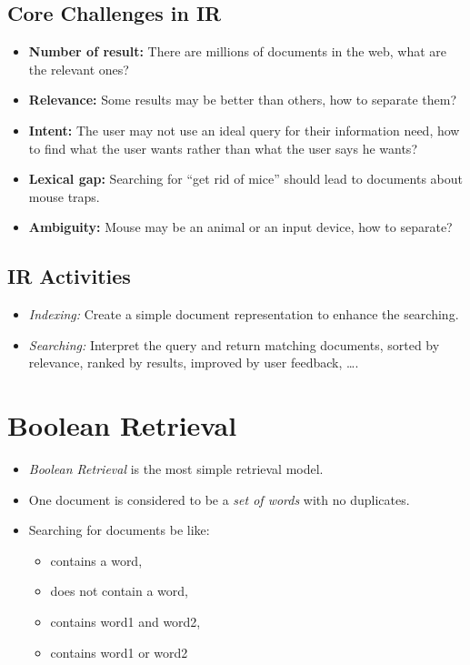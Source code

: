         \subsection{Core Challenges in IR} %
            \begin{itemize}
            	\item \textbf{Number of result:} There are millions of documents in the web, what are the relevant ones?
            	\item \textbf{Relevance:} Some results may be better than others, how to separate them?
            	\item \textbf{Intent:} The user may not use an ideal query for their information need, how to find what the user wants rather than what the user says he wants?
            	\item \textbf{Lexical gap:} Searching for \enquote{get rid of mice} should lead to documents about mouse traps.
            	\item \textbf{Ambiguity:} Mouse may be an animal or an input device, how to separate?
            \end{itemize}

        \subsection{IR Activities} %
            \begin{itemize}
            	\item \textit{Indexing:} Create a simple document representation to enhance the searching.
            	\item \textit{Searching:} Interpret the query and return matching documents, sorted by relevance, ranked by results, improved by user feedback, \dots.
            \end{itemize}

    \section{Boolean Retrieval} %
        \begin{itemize}
        	\item \textit{Boolean Retrieval} is the most simple retrieval model.
        	\item One document is considered to be a \textit{set of words} with no duplicates.
        	\item Searching for documents be like:
        		\begin{itemize}
        			\item contains a word,
        			\item does not contain a word,
        			\item contains word1 and word2,
        			\item contains word1 or word2
        		\end{itemize}
        \end{itemize}

